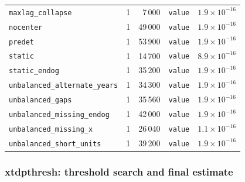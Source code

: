\begin{longtable}{@{}p{3.6cm}rrp{4.9cm}r@{}}
\texttt{maxlag\_\allowbreak{}collapse} & 1 & 7\,000 & \texttt{value} & $1.9\times10^{-16}$ \\
\texttt{nocenter} & 1 & 49\,000 & \texttt{value} & $1.9\times10^{-16}$ \\
\texttt{predet} & 1 & 53\,900 & \texttt{value} & $1.9\times10^{-16}$ \\
\texttt{static} & 1 & 14\,700 & \texttt{value} & $8.9\times10^{-16}$ \\
\texttt{static\_\allowbreak{}endog} & 1 & 35\,200 & \texttt{value} & $1.9\times10^{-16}$ \\
\texttt{unbalanced\_\allowbreak{}alternate\_\allowbreak{}years} & 1 & 34\,300 & \texttt{value} & $1.9\times10^{-16}$ \\
\texttt{unbalanced\_\allowbreak{}gaps} & 1 & 35\,560 & \texttt{value} & $1.9\times10^{-16}$ \\
\texttt{unbalanced\_\allowbreak{}missing\_\allowbreak{}endog} & 1 & 42\,000 & \texttt{value} & $1.9\times10^{-16}$ \\
\texttt{unbalanced\_\allowbreak{}missing\_\allowbreak{}x} & 1 & 26\,040 & \texttt{value} & $1.1\times10^{-16}$ \\
\texttt{unbalanced\_\allowbreak{}short\_\allowbreak{}units} & 1 & 39\,200 & \texttt{value} & $1.9\times10^{-16}$ \\
\bottomrule
\end{longtable}

\subsubsection*{xtdpthresh: threshold search and final estimate}

